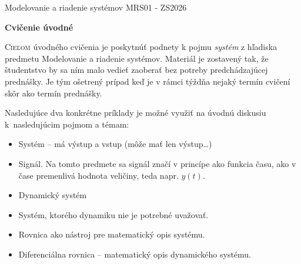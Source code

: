 \documentclass[a4paper, 10pt, ]{article}
\def\oznacenieCasti{MRS01 - ZS2026}
\begin{document}
\lstset{%
style=mystyle,
rangebeginprefix=\#\#\#\ cellB\ ,%
rangebeginsuffix=\ \#\#\#,%
rangeendprefix=\#\#\#\ cellE\ ,%
rangeendsuffix=\ \#\#\#,%
includerangemarker=false,
}






\fontsize{12pt}{22pt}\selectfont

\centerline{\textsf{Modelovanie a riadenie systémov} \hfill \textsf{\oznacenieCasti}}

\fontsize{18pt}{22pt}\selectfont





\begin{flushleft}
	\textbf{\textsf{Cvičenie úvodné}}
\end{flushleft}






\normalsize

\bigskip

{\hypersetup{hidelinks}

\tableofcontents

}

\bigskip

\vspace{18pt}



\noindent
\lettrine[lines=3, nindent=0pt]{C}{ieľom} úvodného cvičenia je poskytnúť podnety k pojmu \emph{systém} z hľadiska predmetu Modelovanie a riadenie systémov. Materiál je zostavený tak, že študentstvo by sa ním malo vedieť zaoberať bez potreby predchádzajúcej prednášky. Je tým ošetrený prípad keď je v rámci týždňa nejaký termín cvičení skôr ako termín prednášky.

\bigskip

\noindent
Nasledujúce dva konkrétne príklady je možné využiť na úvodnú diskusiu k~nasledujúcim pojmom a témam:

\begin{itemize}[leftmargin=0pt, labelsep=1mm, itemsep=-4pt, topsep=0pt, ]
    \item Systém -- má výstup a vstup (môže mať len výstup\ldots)
    \item Signál. Na tomto predmete sa signál značí v princípe ako funkcia času, ako v čase premenlivá hodnota veličiny, teda napr. $y(t)$.
    \item Dynamický systém
    \item Systém, ktorého dynamiku nie je potrebné uvažovať.
    \item Rovnica ako nástroj pre matematický opis systému.
    \item Diferenciálna rovnica -- matematický opis dynamického systému.
\end{itemize}
\end{document}
